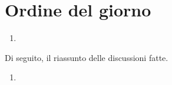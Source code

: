 \documentclass[../AnalisiDeiRequisiti.tex]{subfiles}
\begin{document}
	\section*{Ordine del giorno}
		\begin{enumerate}
			\item  
		\end{enumerate}
		Di seguito, il riassunto delle discussioni fatte.
		\begin{enumerate}
		\item 
		
		\end{enumerate}
\end{document}
